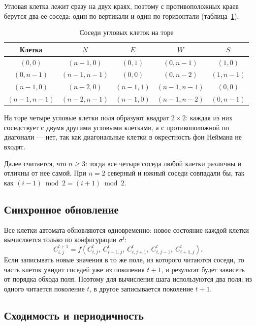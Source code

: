 \documentclass[a4paper,14pt]{extarticle}
\begin{document}
Угловая клетка лежит сразу на двух краях, поэтому с противоположных краев берутся два ее соседа: один по вертикали и один по горизонтали (таблица~\ref{tab:corners}).

\begin{table}[H]
	\centering
	\caption{Соседи угловых клеток на торе}
	\label{tab:corners}
	\begin{tabular}{|c|c|c|c|c|}
		\hline
		Клетка & $N$ & $E$ & $W$ & $S$ \\
		\hline
		$(0, 0)$         & $(n-1, 0)$   & $(0, 1)$     & $(0, n-1)$   & $(1, 0)$ \\
		$(0, n-1)$       & $(n-1, n-1)$ & $(0, 0)$     & $(0, n-2)$   & $(1, n-1)$ \\
		$(n-1, 0)$       & $(n-2, 0)$   & $(n-1, 1)$   & $(n-1, n-1)$ & $(0, 0)$ \\
		$(n-1, n-1)$     & $(n-2, n-1)$ & $(n-1, 0)$   & $(n-1, n-2)$ & $(0, n-1)$ \\
		\hline
	\end{tabular}
\end{table}

На торе четыре угловые клетки поля образуют квадрат $2 \times 2$: каждая из них соседствует с двумя другими угловыми клетками, а с противоположной по диагонали --- нет, так как диагональные клетки в окрестность фон Неймана не входят.

Далее считается, что $n \ge 3$: тогда все четыре соседа любой клетки различны и отличны от нее самой. При $n = 2$ северный и южный соседи совпадали бы, так как $(i-1) \bmod 2 = (i+1) \bmod 2$.

\subsection{Синхронное обновление}

Все клетки автомата обновляются одновременно: новое состояние каждой клетки вычисляется только по конфигурации $\sigma^t$:
\[
	C^{t+1}_{i,j} = f\left(C^t_{i,j},\ C^t_{i-1,j},\ C^t_{i,j+1},\ C^t_{i,j-1},\ C^t_{i+1,j}\right).
\]
Если записывать новые значения в то же поле, из которого читаются соседи, то часть клеток увидит соседей уже из поколения $t+1$, и результат будет зависеть от порядка обхода поля. Поэтому для вычисления шага используются два поля: из одного читается поколение $t$, в другое записывается поколение $t+1$.

\subsection{Сходимость и периодичность}
\label{sec:period}
\end{document}
